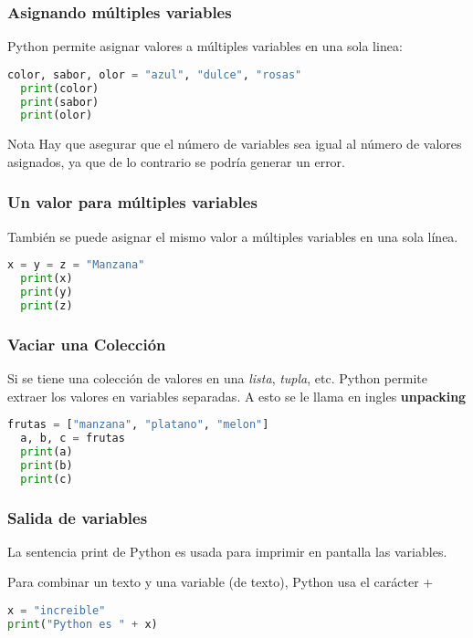 \begin{frame}[fragile]
  \frametitle{Asignando múltiples variables}

  Python permite asignar valores a múltiples variables en una sola linea:

  \vspace{\baselineskip}
  \begin{lstlisting}[language=Python]
  color, sabor, olor = "azul", "dulce", "rosas"
  print(color)
  print(sabor)
  print(olor)
  \end{lstlisting}

  \begin{alertblock}{Nota}
    Hay que asegurar que el número de variables sea igual al número de valores
    asignados, ya que de lo contrario se podría generar un error.
  \end{alertblock}
\end{frame}

\begin{frame}[fragile]
  \frametitle{Un valor para múltiples variables}

  También se puede asignar el mismo valor a múltiples variables en una sola
  línea.

  \vspace{\baselineskip}
  \begin{lstlisting}[language=Python]
  x = y = z = "Manzana"
  print(x)
  print(y)
  print(z)
  \end{lstlisting}
\end{frame}

\begin{frame}[fragile]
  \frametitle{Vaciar una Colección}

  Si se tiene una colección de valores en una \textit{lista}, \textit{tupla},
  etc. Python permite extraer los valores en variables separadas. A esto
  se le llama en ingles \textbf{unpacking}

  \vspace{\baselineskip}
  \begin{lstlisting}[language=Python]
  frutas = ["manzana", "platano", "melon"]
  a, b, c = frutas
  print(a)
  print(b)
  print(c)
  \end{lstlisting}
\end{frame}

\begin{frame}[fragile]
  \frametitle{Salida de variables}

  La sentencia \textcolor{codeKeyword}{print} de Python es usada para
  imprimir en pantalla las variables.

  \vspace{\baselineskip}
  Para combinar un texto y una variable (de texto), Python usa el carácter
  \textcolor{codeKeyword}{+}

  \begin{lstlisting}[language=Python]
x = "increible"
print("Python es " + x)
  \end{lstlisting}
\end{frame}

